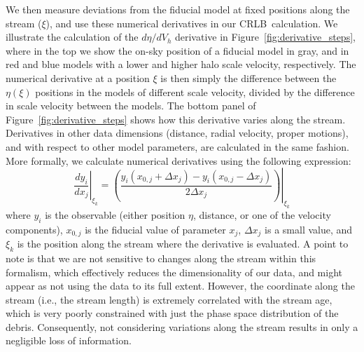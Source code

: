 \documentclass[modern]{aastex61}
\newcommand{\acronym}[1]{{\small{#1}}}
\newcommand{\CRLB}{\acronym{CRLB}}
\begin{document}
We then measure deviations from the fiducial model at fixed positions along the stream ($\xi$), and use these numerical derivatives in our \CRLB\ calculation.
We illustrate the calculation of the $d\eta/d V_h$ derivative in Figure~\ref{fig:derivative_steps}, where in the top we show the on-sky position of a fiducial model in gray, and in red and blue models with a lower and higher halo scale velocity, respectively.
The numerical derivative at a position $\xi$ is then simply the difference between the $\eta(\xi)$ positions in the models of different scale velocity, divided by the difference in scale velocity between the models.
The bottom panel of Figure~\ref{fig:derivative_steps} shows how this derivative varies along the stream.
Derivatives in other data dimensions (distance, radial velocity, proper motions), and with respect to other model parameters, are calculated in the same fashion.
More formally, we calculate numerical derivatives using the following expression:
\begin{equation}
\left.\frac{d y_i}{d x_j}\right\rvert_{\xi_k} = \left.\left(\frac{y_i(x_{0,j} + \Delta x_j) - y_i(x_{0,j} - \Delta x_j)}{2\Delta x_j}\right)\right\rvert_{\xi_k}
\label{eq:derivative}
\end{equation}
where $y_i$ is the observable (either position $\eta$, distance, or one of the velocity components), $x_{0,j}$ is the fiducial value of parameter $x_j$, $\Delta x_j$ is a small value, and $\xi_k$ is the position along the stream where the derivative is evaluated.
A point to note is that we are not sensitive to changes along the stream within this formalism, which effectively reduces the dimensionality of our data, and might appear as not using the data to its full extent.
However, the coordinate along the stream (i.e., the stream length) is extremely correlated with the stream age, which is very poorly constrained with just the phase space distribution of the debris.
Consequently, not considering variations along the stream results in only a negligible loss of information.
\end{document}
